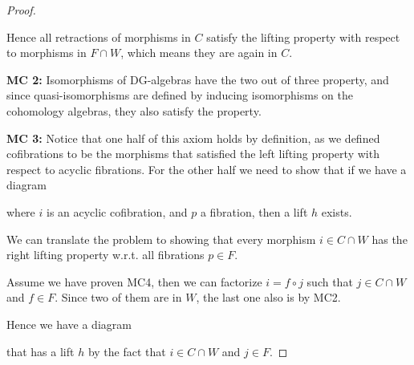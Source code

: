 \begin{proof}
\begin{center}
\begin{tikzpicture}[%
	cross line/.style={preaction={draw=white, -,line width=6pt}}]
\end{tikzpicture}
\end{center}
Hence all retractions of morphisms in $C$ satisfy the lifting property with respect to morphisms in $F\cap W$, which means they are again in $C$. 


\textbf{MC 2:} Isomorphisms of DG-algebras have the two out of three property, and since quasi-isomorphisms are defined by inducing isomorphisms on the cohomology algebras, they also satisfy the property. 
    
\textbf{MC 3:} Notice that one half of this axiom holds by definition, as we defined cofibrations to be the morphisms that satisfied the left lifting property with respect to acyclic fibrations. For the other half we need to show that if we have a diagram 
\begin{center}
\end{center}
where $i$ is an acyclic cofibration, and $p$ a fibration, then a lift $h$ exists. 
    
We can translate the problem to showing that every morphism $i\in C\cap W$ has the right lifting property w.r.t. all fibrations $p\in F$. 
    
Assume we have proven MC4, then we can factorize $i= f\circ j$ such that $j\in C\cap W$ and $f\in F$. Since two of them are in $W$, the last one also is by MC2.

Hence we have a diagram 
\begin{center}
\end{center}
    
that has a lift $h$ by the fact that $i\in C\cap W$ and $j\in F$. 


\end{proof}
